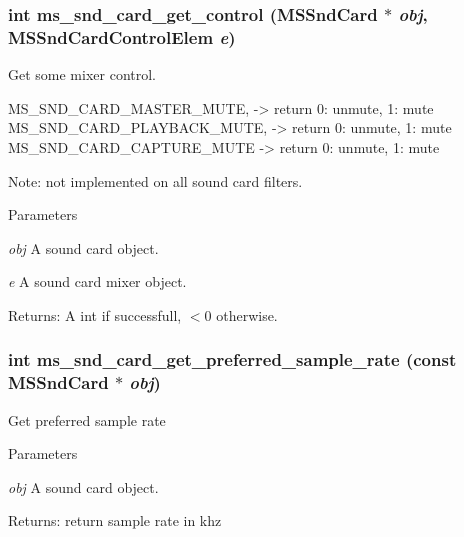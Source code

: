 \subsubsection[{ms\_\-snd\_\-card\_\-get\_\-control}]{\setlength{\rightskip}{0pt plus 5cm}int ms\_\-snd\_\-card\_\-get\_\-control ({\bf MSSndCard} $\ast$ {\em obj}, \/  {\bf MSSndCardControlElem} {\em e})}\label{group__mediastreamer2__soundcardfilter_ga9cb2d05a4fdc5b915035ff444e51ae6d}
Get some mixer control.


\begin{DoxyPre}
   MS\_SND\_CARD\_MASTER\_MUTE, -> return 0: unmute, 1: mute
   MS\_SND\_CARD\_PLAYBACK\_MUTE, -> return 0: unmute, 1: mute
   MS\_SND\_CARD\_CAPTURE\_MUTE -> return 0: unmute, 1: mute
 \end{DoxyPre}
 Note: not implemented on all sound card filters.


\begin{DoxyParams}{Parameters}
\item[{\em obj}]A sound card object. \item[{\em e}]A sound card mixer object.\end{DoxyParams}
Returns: A int if successfull, $<$0 otherwise. 
\subsubsection[{ms\_\-snd\_\-card\_\-get\_\-preferred\_\-sample\_\-rate}]{\setlength{\rightskip}{0pt plus 5cm}int ms\_\-snd\_\-card\_\-get\_\-preferred\_\-sample\_\-rate (const {\bf MSSndCard} $\ast$ {\em obj})}\label{group__mediastreamer2__soundcardfilter_ga80af63f473c08af92fbed6f9682febc2}
Get preferred sample rate


\begin{DoxyParams}{Parameters}
\item[{\em obj}]A sound card object.\end{DoxyParams}
Returns: return sample rate in khz 
